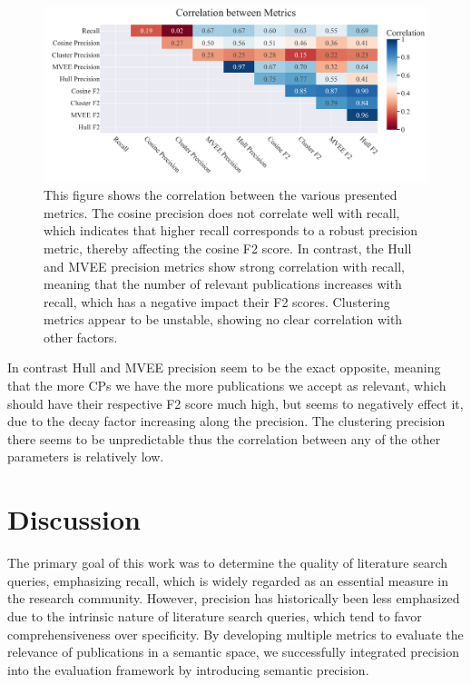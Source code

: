 \begin{figure}[!h]
	\centering
	\includegraphics[scale=0.4]{pics/metrics_correlation.pdf}
	\caption[Metrics Correlation]{This figure shows the correlation between the various presented metrics. The cosine precision does not correlate well with recall, which indicates that higher recall corresponds to a robust precision metric, thereby affecting the cosine F2 score. In contrast, the Hull and MVEE precision metrics show strong correlation with recall, meaning that the number of relevant publications increases with recall, which has a negative impact their F2 scores. Clustering metrics appear to be unstable, showing no clear correlation with other factors.}
	\label{fig:metrics-correlation}
\end{figure}


In contrast Hull and MVEE precision seem to be the exact opposite, meaning that the more CPs we have the more publications we accept as relevant, which should have their respective F2 score much high, but seems to negatively effect it, due to the decay factor increasing along the precision. The clustering precision there seems to be unpredictable thus the correlation between any of the other parameters is relatively low.

\section{Discussion}

The primary goal of this work was to determine the quality of literature search queries, emphasizing recall, which is widely regarded as an essential measure in the research community. However, precision has historically been less emphasized due to the intrinsic nature of literature search queries, which tend to favor comprehensiveness over specificity. By developing multiple metrics to evaluate the relevance of publications in a semantic space, we successfully integrated precision into the evaluation framework by introducing semantic precision.

